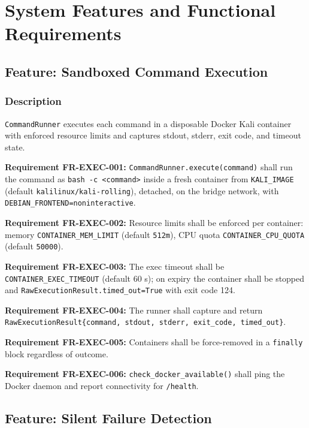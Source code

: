 \documentclass[10pt,journal,onecolumn]{IEEEtran}
\newcommand{\reqid}[1]{\textbf{#1}}
\begin{document}
\section{System Features and Functional Requirements}

\subsection{Feature: Sandboxed Command Execution}

\subsubsection{Description}

\texttt{CommandRunner} executes each command in a disposable Docker Kali container with enforced resource limits and captures stdout, stderr, exit code, and timeout state.

\reqid{Requirement FR-EXEC-001:} \texttt{CommandRunner.\allowbreak execute(command)} shall run the command as \texttt{bash -c <command>} inside a fresh container from \texttt{KALI\_IMAGE} (default \texttt{kalilinux/kali-rolling}), detached, on the bridge network, with \texttt{DEBIAN\_\allowbreak FRONTEND=noninteractive}.

\reqid{Requirement FR-EXEC-002:} Resource limits shall be enforced per container: memory \texttt{CONTAINER\_MEM\_LIMIT} (default \texttt{512m}), CPU quota \texttt{CONTAINER\_CPU\_QUOTA} (default \texttt{50000}).

\reqid{Requirement FR-EXEC-003:} The exec timeout shall be \texttt{CONTAINER\_EXEC\_TIMEOUT} (default 60 s); on expiry the container shall be stopped and \texttt{RawExecutionResult.\allowbreak timed\_\allowbreak out=True} with exit code 124.

\reqid{Requirement FR-EXEC-004:} The runner shall capture and return \texttt{RawExecutionResult\{command, stdout, stderr, exit\_\allowbreak code, timed\_\allowbreak out\}}.

\reqid{Requirement FR-EXEC-005:} Containers shall be force-removed in a \texttt{finally} block regardless of outcome.

\reqid{Requirement FR-EXEC-006:} \texttt{check\_\allowbreak docker\_\allowbreak available()} shall ping the Docker daemon and report connectivity for \texttt{/health}.

\subsection{Feature: Silent Failure Detection}
\end{document}
